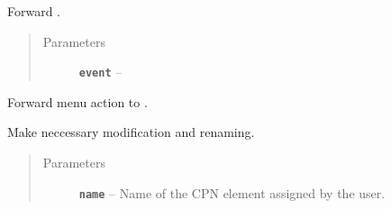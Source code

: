 \documentclass[a4paper,10pt,english]{sphinxmanual}
\begin{document}
\begin{fulllineitems}
\begin{fulllineitems}
\begin{quote}
\begin{description}
\end{description}\end{quote}

\end{fulllineitems}


\begin{fulllineitems}
\label{model_link:model.TransitionItem.TransitionItem.mouseReleaseEvent}
Forward .
\begin{quote}\begin{description}
\item[{Parameters}] \leavevmode
\textbf{\texttt{event}} -- 

\end{description}\end{quote}

\end{fulllineitems}


\begin{fulllineitems}
\label{model_link:model.TransitionItem.TransitionItem.openSubnet}
Forward menu action  to .

\end{fulllineitems}


\begin{fulllineitems}
\label{model_link:model.TransitionItem.TransitionItem.renameModifications}
Make neccessary modification and renaming.
\begin{quote}\begin{description}
\item[{Parameters}] \leavevmode
\textbf{\texttt{name}} -- Name of the CPN element assigned by the user.

\end{description}\end{quote}

\end{fulllineitems}


\end{fulllineitems}
\end{document}
